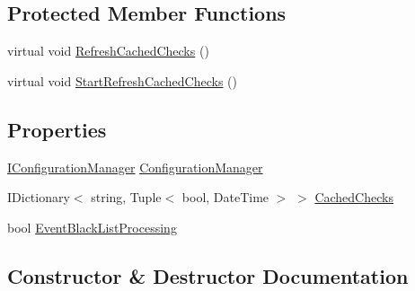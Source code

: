 \subsection*{Protected Member Functions}
\begin{DoxyCompactItemize}
\item 
virtual void \hyperlink{classCqrs_1_1Bus_1_1BusHelper_ad589391a51cd61673d2403ee8012e713_ad589391a51cd61673d2403ee8012e713}{Refresh\+Cached\+Checks} ()
\item 
virtual void \hyperlink{classCqrs_1_1Bus_1_1BusHelper_a23bfab1be70af651cc48033fcdf4ce2c_a23bfab1be70af651cc48033fcdf4ce2c}{Start\+Refresh\+Cached\+Checks} ()
\end{DoxyCompactItemize}
\subsection*{Properties}
\begin{DoxyCompactItemize}
\item 
\hyperlink{interfaceCqrs_1_1Configuration_1_1IConfigurationManager}{I\+Configuration\+Manager} \hyperlink{classCqrs_1_1Bus_1_1BusHelper_aff0eaa0679d808e268ab4b5fb669bac8_aff0eaa0679d808e268ab4b5fb669bac8}{Configuration\+Manager}
\item 
I\+Dictionary$<$ string, Tuple$<$ bool, Date\+Time $>$ $>$ \hyperlink{classCqrs_1_1Bus_1_1BusHelper_ae29e80bd315b6284509c9fd0b977d2a0_ae29e80bd315b6284509c9fd0b977d2a0}{Cached\+Checks}
\item 
bool \hyperlink{classCqrs_1_1Bus_1_1BusHelper_ae8d3525369ee9572de06f935cc09510b_ae8d3525369ee9572de06f935cc09510b}{Event\+Black\+List\+Processing}
\end{DoxyCompactItemize}


\subsection{Constructor \& Destructor Documentation}
\mbox{\label{classCqrs_1_1Bus_1_1BusHelper_a7799db8bc78bdd9ec25be5bd301d0b8a_a7799db8bc78bdd9ec25be5bd301d0b8a}} 
